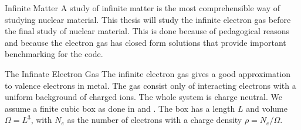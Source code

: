 \documentclass[twoside,english]{uiofysmaster}
\begin{document}
\begin{chapter}{Infinite Matter}
	A study of infinite matter is the most comprehensible way of studying nuclear material. This thesis will study the infinite electron gas before the final study of nuclear material. This is done because of pedagogical reasons and because the electron gas has closed form solutions that provide important benchmarking for the code. 
	\begin{section}{The Infinate Electron Gas}
		The infinite electron gas gives a good approximation to valence electrons in metal. The gas consist only of interacting electrons with a uniform background of charged ions. The whole system is charge neutral. We assume a finite cubic box as done in \cite{Shepherd2012} and \cite{Shepherd2013}. The box has a length $L$ and volume $\Omega = L^3$, with $N_e$ as the number of electrons with a charge density $\rho = N_e / \Omega$.


\end{section}
\end{chapter}
\end{document}
